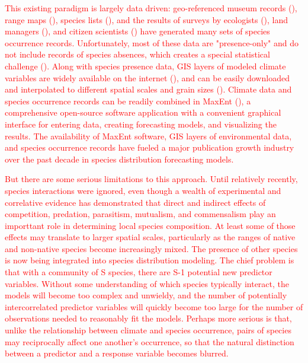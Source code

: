 \documentclass{article}
\newcommand{\Ntxt}[1]{\textcolor{red}{#1}}
\begin{document}
\Ntxt{This existing paradigm is largely data driven: geo-referenced museum records (), range maps (), species lists (), and the results of surveys by ecologists (), land managers (), and citizen scientists () have generated many sets of species occurrence records. Unfortunately, most of these data are "presence-only" and do not include records of species absences, which creates a special statistical challenge (). Along with species presence data, GIS layers of modeled climate variables are widely available on the internet (), and  can be easily downloaded and interpolated to different spatial scales and grain sizes (). Climate data and species occurrence records can be readily combined in MaxEnt (), a comprehensive open-source software application with a convenient graphical interface for entering data, creating forecasting models, and visualizing the results. The availability of MaxEnt software, GIS layers of environmental data, and species occurrence records have fueled a major publication growth industry over the past decade in species distribution forecasting models.}

\Ntxt{But there are some serious limitations to this approach. Until relatively recently, species interactions were ignored, even though a wealth of experimental and correlative evidence has demonstrated that direct and indirect effects of competition, predation, parasitism, mutualism, and commensalism play an importtant role in determining local species composition. At least some of those effects may translate to larger spatial scales, particularly as the ranges of native and non-native species become increasingly mixed. The presence of other species is now being integrated into species distribution modeling. The chief problem is that with a community of S species, there are S-1 potential new predictor variables. Without some understanding of which species typically interact, the models will become too complex and unwieldy, and the number of potentially intercorrelated predictor variables will quickly become too large for the number of observations needed to reasonably fit the models. Perhaps more serious is that, unlike the relationship between climate and species occurrence, pairs of species may reciprocally affect one another's occurrence, so that the natural distinction between a predictor and a response variable becomes blurred.}
\end{document}
